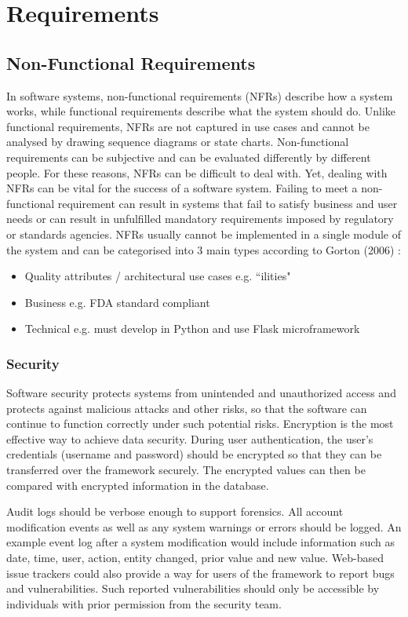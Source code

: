 \chapter{Requirements}


\section{Non-Functional Requirements}

In software systems, non-functional requirements (NFRs) describe how a system works, while functional requirements describe what the system should do. Unlike functional requirements, NFRs are not captured in use cases and cannot be analysed by drawing sequence diagrams or state charts. Non-functional requirements can be subjective and can be evaluated differently by different people. For these reasons, NFRs can be difficult to deal with. Yet, dealing with NFRs can be vital for the success of a software system. \cite{nfrs} Failing to meet a non-functional requirement can result in systems that fail to satisfy business and user needs or can result in unfulfilled mandatory requirements imposed by regulatory or standards agencies. NFRs usually cannot be implemented in a single module of the system and can be categorised into 3 main types according to Gorton (2006) \cite{sw-arch}:
\begin{itemize}
  \item Quality attributes / architectural use cases e.g. ``ilities"
  \item Business e.g. FDA standard compliant
  \item Technical e.g. must develop in Python and use Flask microframework
\end{itemize}

\subsection{Security}
Software security protects systems from unintended and unauthorized access and protects against malicious attacks and other risks, so that the software can continue to function correctly under such potential risks. Encryption is the most effective way to achieve data security. During user authentication, the user's credentials (username and password) should be encrypted so that they can be transferred over the framework securely. The encrypted values can then be compared with encrypted information in the database.

Audit logs should be verbose enough to support forensics. All account modification events as well as any system warnings or errors should be logged. An example event log after a system modification would include information such as date, time, user, action, entity changed, prior value and new value. Web-based issue trackers could also provide a way for users of the framework to report bugs and vulnerabilities. Such reported vulnerabilities should only be accessible by individuals with prior permission from the security team.

